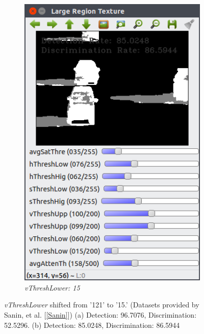 \documentclass[12pt]{report}
\begin{document}
\begin{figure}
\begin{subfigure}{.49\linewidth}
    \includegraphics[width=1\linewidth]{figures/background/lr_highway1_thresh15.png}
    \caption{\textit{vThreshLower: 15}}
  \end{subfigure}
  \caption{\textit{vThreshLower} shifted from '121' to '15.' (Datasets provided by Sanin, et al. [\ref{Sanin}]) (a) Detection: 96.7076, Discrimination: 52.5296. (b) Detection: 85.0248, Discrimination: 86.5944}
  \label{fig:vthresh15}
\end{figure}
\end{document}
